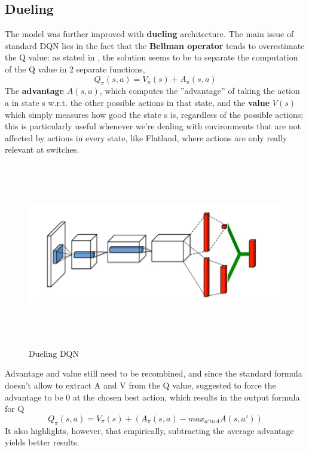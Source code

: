 \subsection{Dueling}

The model was further improved with \textbf{dueling} architecture. The main issue of standard DQN lies in the fact that the \textbf{Bellman operator} tends to overestimate the Q value: as stated in \cite{dueling}, the solution seems to be to separate the computation of the Q value in 2 separate functions, $$Q_{\pi}(s,a) = V_{\pi}(s) + A_{\pi}(s,a) $$ The \textbf{advantage} $A(s,a)$, which computes the  ''advantage'' of taking the action a in state s w.r.t. the other possible actions in that state, and the \textbf{value} $V(s)$ which simply measures how good the state s is, regardless of the possible actions; this is particularly useful whenever we're dealing with environments that are not affected by actions in every state, like Flatland, where actions are only really relevant at switches.

\begin{figure}[H] 
\includegraphics[height=80mm, width=140mm, scale=0.5]{chapters/dueling.jpg}
\centering
\caption{Dueling DQN}
\label{fig:s4} 
\end{figure}
\noindent
Advantage and value still need to be recombined, and since the standard formula doesn't allow to extract A and V from the Q value, \cite{dueling} suggested to force the advantage to be 0 at the chosen best action, which results in the output formula for Q $$Q_{\pi}(s,a) = V_{\pi}(s) + (A_{\pi}(s,a) - max_{a' in A} A(s,a'))$$ It also highlights, however, that empirically, subtracting the average advantage yields better results.
